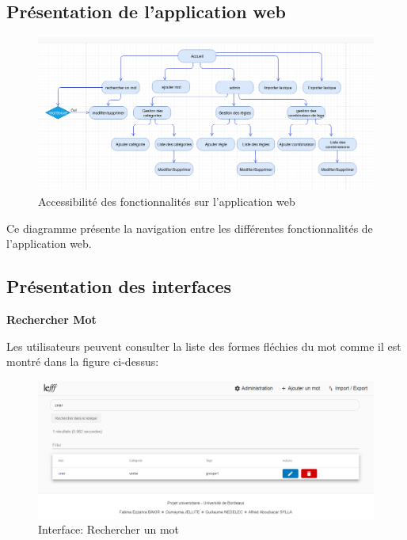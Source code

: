 \documentclass[12pt,a4paper]{article}
\begin{document}
    \subsection{Présentation de l'application web}

    \begin{figure}[h]
        \centering
        \includegraphics[width=150mm]{img/site1.png}
        \caption{Accessibilité des fonctionnalités sur l'application web}
        \label{Tux}
    \end{figure}

    Ce diagramme présente la navigation entre les différentes fonctionnalités de l'application web.

    \subsection{Présentation des interfaces}

    \textbf{ Rechercher Mot }

    Les utilisateurs peuvent consulter la liste des formes fléchies du mot comme il est montré dans la figure ci-dessus:

    \begin{figure}[h]
        \centering
        \includegraphics[width=150mm]{img/Recherche.PNG}
        \caption{Interface: Rechercher un mot}
        \label{Tux}
    \end{figure}
\end{document}
